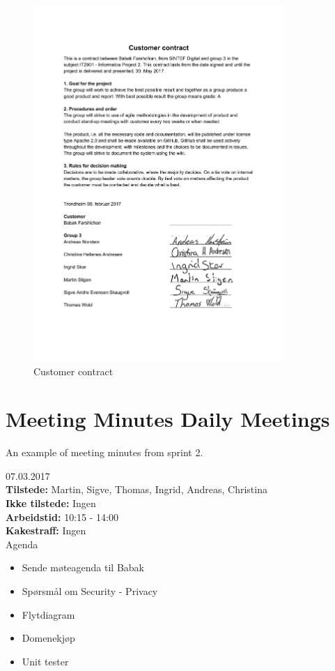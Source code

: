 \begin{figure}[H]
\centering
    \includegraphics[width=0.85\textwidth]{fig/CustomerContract.pdf}
    \caption{Customer contract}
    \label{Customer_Contreact}
\end{figure}

\section{Meeting Minutes Daily Meetings}
\label{meeting_minutes_daily_meetings}

An example of meeting minutes from sprint 2. 

{\huge{07.03.2017}}\\
\textbf{Tilstede:} Martin, Sigve, Thomas, Ingrid, Andreas, Christina\\
\textbf{Ikke tilstede:} Ingen\\
\textbf{Arbeidstid:} 10:15 - 14:00\\
\textbf{Kakestraff:} Ingen \\

{\Large{Agenda}}
\begin{itemize} 
    \item Sende møteagenda til Babak
    \item Spørsmål om Security - Privacy
    \item Flytdiagram
    \item Domenekjøp
    \item Unit tester
\end{itemize}


